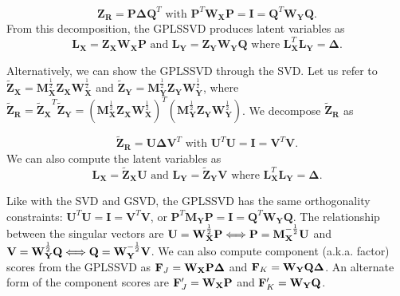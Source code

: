 \documentclass[12pt]{article}
\begin{document}
\begin{equation}
{\mathbf Z}_{\mathbf R} = {\mathbf P} {\boldsymbol \Delta} {\mathbf Q}^{T}
\textrm{ with }
{\mathbf P}^{T}{\mathbf W}_{\mathbf X}{\mathbf P} = {\mathbf I} =
{\mathbf Q}^{T}{\mathbf W}_{\mathbf Y}{\mathbf Q}.
\end{equation} From this decomposition, the GPLSSVD produces latent
variables as \begin{equation}
{\mathbf L}_{\mathbf X} 
= {\mathbf Z}_{\mathbf X}{\mathbf W}_{\mathbf X}{\mathbf P} 
\textrm{ and } 
{\mathbf L}_{\mathbf Y} = 
{\mathbf Z}_{\mathbf Y}{\mathbf W}_{\mathbf Y}{\mathbf Q}
\textrm{ where }
{\mathbf L}_{\mathbf X}^{T} {\mathbf L}_{\mathbf Y} 
= {\boldsymbol \Delta}. 
\end{equation}

Alternatively, we can show the GPLSSVD through the SVD. Let us refer to
\({\widetilde{\mathbf Z}_{\mathbf X}} = {\mathbf M}_{\mathbf X}^{\frac{1}{2}}{\mathbf Z}_{\mathbf X}{\mathbf W}_{\mathbf X}^{\frac{1}{2}}\)
and
\({\widetilde{\mathbf Z}_{\mathbf Y}} = {\mathbf M}_{\mathbf Y}^{\frac{1}{2}}{\mathbf Z}_{\mathbf Y}{\mathbf W}_{\mathbf Y}^{\frac{1}{2}}\),
where
\(\widetilde{\mathbf Z}_{\mathbf R} = {\widetilde{\mathbf Z}_{\mathbf X}}^{T}{\widetilde{\mathbf Z}_{\mathbf Y}} = ({\mathbf M}_{\mathbf X}^{\frac{1}{2}}{\mathbf Z}_{\mathbf X}{\mathbf W}_{\mathbf X}^{\frac{1}{2}})^{T}({\mathbf M}_{\mathbf Y}^{\frac{1}{2}}{\mathbf Z}_{\mathbf Y}{\mathbf W}_{\mathbf Y}^{\frac{1}{2}})\).
We decompose \(\widetilde{\mathbf Z}_{\mathbf R}\) as

\begin{equation}
\widetilde{\mathbf Z}_{\mathbf R} = {\mathbf U} {\boldsymbol \Delta} {\mathbf V}^{T}
\textrm{ with }
{\mathbf U}^{T}{\mathbf U} = {\mathbf I} =
{\mathbf V}^{T}{\mathbf V}.
\end{equation} We can also compute the latent variables as
\begin{equation}
{\mathbf L}_{\mathbf X} 
= \widetilde{\mathbf Z}_{\mathbf X}{\mathbf U} 
\textrm{ and } 
{\mathbf L}_{\mathbf Y} = 
\widetilde{\mathbf Z}_{\mathbf Y}{\mathbf V}
\textrm{ where }
{\mathbf L}_{\mathbf X}^{T} {\mathbf L}_{\mathbf Y} 
= {\boldsymbol \Delta}. 
\end{equation}

Like with the SVD and GSVD, the GPLSSVD has the same orthogonality
constraints:
\({\mathbf U}^{T}{\mathbf U} = {\mathbf I} = {\mathbf V}^{T}{\mathbf V}\),
or
\({\mathbf P}^{T}{\mathbf M}_{\mathbf Y}{\mathbf P} = {\mathbf I} = {\mathbf Q}^{T}{\mathbf W}_{\mathbf Y}{\mathbf Q}\).
The relationship between the singular vectors are
\({\mathbf U} = {\mathbf W}_{\bf X}^{\frac{1}{2}}{\mathbf P} \Longleftrightarrow {\mathbf P} = {\mathbf M}_{\bf X}^{-\frac{1}{2}}{\mathbf U}\)
and
\({\mathbf V} = {\mathbf W}_{\bf Y}^{\frac{1}{2}}{\mathbf Q} \Longleftrightarrow {\mathbf Q} = {\mathbf W}_{\bf Y}^{-\frac{1}{2}}{\mathbf V}\).
We can also compute component (a.k.a. factor) scores from the GPLSSVD as
\({\bf F}_{J} = {\mathbf W}_{\bf X}{\mathbf P}{\boldsymbol \Delta}\) and
\({\bf F}_{K} = {\mathbf W}_{\bf Y}{\mathbf Q}{\boldsymbol \Delta}\). An
alternate form of the component scores are
\({\bf F}_{J}' = {\mathbf W}_{\bf X}{\mathbf P}\) and
\({\bf F}_{K}' = {\mathbf W}_{\bf Y}{\mathbf Q}\).
\end{document}
